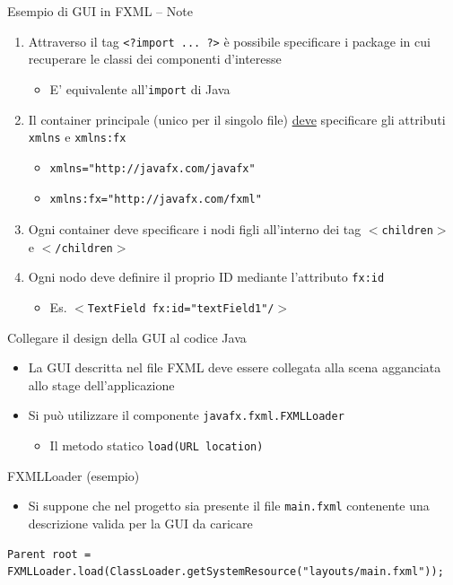 \documentclass[presentation]{beamer}
\begin{document}
\begin{frame}[fragile]{Esempio di GUI in FXML -- Note}
\begin{enumerate}\itemsep15pt
\item Attraverso il tag \texttt{<?import ... ?>} è possibile specificare i package in cui recuperare le classi dei componenti d'interesse
\begin{itemize}
\item E' equivalente all'\texttt{import} di Java
\end{itemize}
\item Il container principale (unico per il singolo file) \underline{deve} specificare gli attributi \texttt{xmlns} e \texttt{xmlns:fx}
\begin{itemize}
\item \begin{verbatim}xmlns="http://javafx.com/javafx"\end{verbatim}
\item \begin{verbatim}xmlns:fx="http://javafx.com/fxml"\end{verbatim}
\end{itemize}
\item Ogni container deve specificare i nodi figli all'interno dei tag \texttt{$<$children$>$} e \texttt{$<$/children$>$}
\item Ogni nodo deve definire il proprio ID mediante l'attributo \texttt{fx:id}
\begin{itemize}
\item Es. \texttt{$<$TextField fx:id="textField1"/$>$}
\end{itemize}
\end{enumerate}
\end{frame}

\begin{frame}[fragile]{Collegare il design della GUI al codice Java}
\begin{itemize}\itemsep10pt
\item La GUI descritta nel file FXML deve essere collegata alla scena agganciata allo stage dell'applicazione
\item Si può utilizzare il componente \texttt{javafx.fxml.FXMLLoader}
\begin{itemize}
\item Il metodo statico \texttt{load(URL location)}
\end{itemize}
\end{itemize}
\begin{block}{FXMLLoader (esempio)}
\begin{itemize}
\item Si suppone che nel progetto sia presente il file \texttt{main.fxml} contenente una descrizione valida per la GUI da caricare
\end{itemize}
\begin{lstlisting}
Parent root = FXMLLoader.load(ClassLoader.getSystemResource("layouts/main.fxml"));
\end{lstlisting}
\end{block}
\end{frame}
\end{document}

